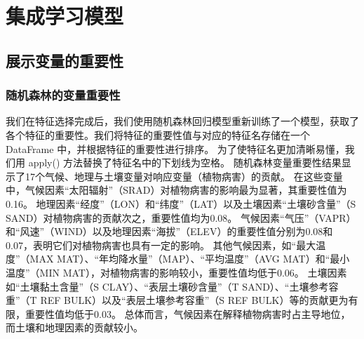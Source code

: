 \documentclass[AutoFakeBold]{LZUThesis-PgD&PhD}
\begin{document}
	
	
%		
%		
	\section{集成学习模型}
	
	\subsection{展示变量的重要性}
	
	\subsubsection{随机森林的变量重要性}
	
	我们在特征选择完成后，我们使用随机森林回归模型重新训练了一个模型，获取了各个特征的重要性。我们将特征的重要性值与对应的特征名存储在一个 DataFrame 中，并根据特征的重要性进行排序。
	为了使特征名更加清晰易懂，我们用 apply() 方法替换了特征名中的下划线为空格。
	随机森林变量重要性结果显示了17个气候、地理与土壤变量对响应变量（植物病害）的贡献。
	在这些变量中，气候因素“太阳辐射”（SRAD）对植物病害的影响最为显著，其重要性值为0.16。
	地理因素“经度”（LON）和“纬度”（LAT）以及土壤因素“土壤砂含量”（S SAND）对植物病害的贡献次之，重要性值均为0.08。
	气候因素“气压”（VAPR）和“风速”（WIND）以及地理因素“海拔”（ELEV）的重要性值分别为0.08和0.07，表明它们对植物病害也具有一定的影响。
	其他气候因素，如“最大温度”（MAX MAT）、“年均降水量”（MAP）、“平均温度”（AVG MAT）和“最小温度”（MIN MAT），对植物病害的影响较小，重要性值均低于0.06。
	土壤因素如“土壤黏土含量”（S CLAY）、“表层土壤砂含量”（T SAND）、“土壤参考容重”（T REF BULK）以及“表层土壤参考容重”（S REF BULK）等的贡献更为有限，重要性值均低于0.03。
	总体而言，气候因素在解释植物病害时占主导地位，而土壤和地理因素的贡献较小。
	
\end{document}
